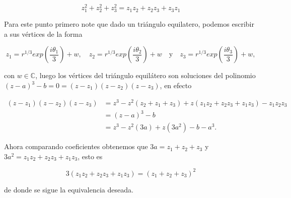 \documentclass[11pt]{article}
\begin{document}
$$
z_{1}^{2}+z_{2}^{2}+z_{3}^{2}=z_{1} z_{2}+z_{2} z_{3}+z_{3} z_{1}
$$

Para este punto primero note que dado un triángulo equilatero, podemos escribir a sus vértices de la forma

$$z_1=r^{1/3}exp\left(\dfrac{i\theta_1}{3}\right)+w, \quad z_2=r^{1/3}exp\left(\dfrac{i\theta_2}{3}\right)+w \quad \text{y}\quad z_3=r^{1/3}exp\left(\dfrac{i\theta_3}{3}\right)+w,$$

con $w\in \mathbb{C}$, luego los vértices del triángulo equilátero son soluciones del polinomio $(z-a)^3-b=0=(z-z_1)(z-z_2)(z-z_3)$, en efecto

\begin{align*}
  (z-z_1)(z-z_2)(z-z_3)&=z^3-z^2(z_2+z_1+z_3)+z(z_1z_2+z_2z_3+z_1z_3)-z_1z_2z_3\\
  &=(z-a)^3-b\\
  &=z^3-z^2(3a)+z(3a^2)-b-a^3
.\end{align*}

Ahora comparando coeficientes obtenemos que $3a=z_1+z_2+z_3$ y $3a^2=z_1z_2+z_2z_3+z_1z_3$, esto es 

$$3(z_1z_2+z_2z_3+z_1z_3)=(z_1+z_2+z_3)^2$$

de donde se sigue la equivalencia deseada.
\end{document}
